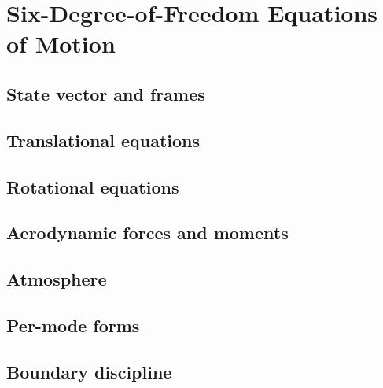 
\section{Six-Degree-of-Freedom Equations of Motion}
\label{apx:eom}

\subsection{State vector and frames}
\label{sub:apx_state_and_frames}

\subsection{Translational equations}
\label{sub:apx_translational}

\subsection{Rotational equations}
\label{sub:apx_rotational}

\subsection{Aerodynamic forces and moments}
\label{sub:apx_aero}

\subsection{Atmosphere}
\label{sub:apx_atmosphere}

\subsection{Per-mode forms}
\label{sub:apx_per_mode_forms}

\subsection{Boundary discipline}
\label{sub:apx_boundary_discipline}
